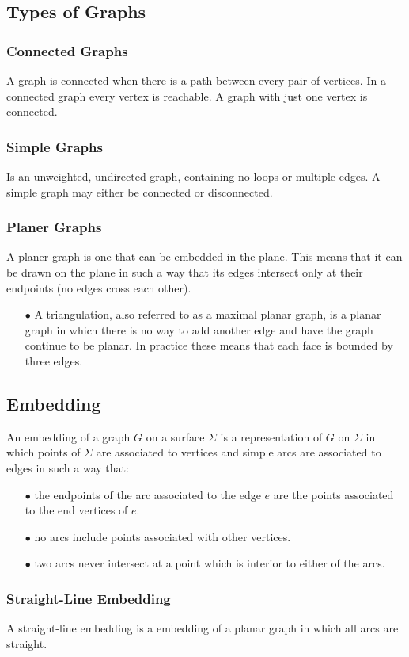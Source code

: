 \documentclass{article}
\begin{document}
\subsection{Types of Graphs}
\subsubsection{Connected Graphs}
A graph is connected when there is a path between every pair of vertices. In a connected graph every vertex is reachable. A graph with just one vertex is connected.
\subsubsection{Simple Graphs}
Is an unweighted, undirected graph, containing no loops or multiple edges. A simple graph may either be connected or disconnected. 
\subsubsection{Planer Graphs}
A planer graph is one that can be embedded in the plane. This means that it can be drawn on the plane in such a way that its edges intersect only at their endpoints (no edges cross each other).
\begin{itemize}
\item[$\bullet$] A triangulation, also referred to as a maximal planar graph, is a planar graph in which there is no way to add another edge and have the graph continue to be planar. In practice these means that each face is bounded by three edges.
\end{itemize}
\subsection{Embedding}
An embedding of a graph $G$ on a surface $\Sigma$ is a representation of $G$ on $\Sigma$ in which points of $\Sigma$ are associated to vertices and simple arcs are associated to edges in such a way that:
\begin{itemize}
\item[$\bullet$] the endpoints of the arc associated to the edge $e$ are the points associated to the end vertices of $e$.
\item[$\bullet$] no arcs include points associated with other vertices.
\item[$\bullet$] two arcs never intersect at a point which is interior to either of the arcs.
\end{itemize}
\subsubsection{Straight-Line Embedding}
A straight-line embedding is a embedding of a planar graph in which all arcs are straight.
\end{document}
